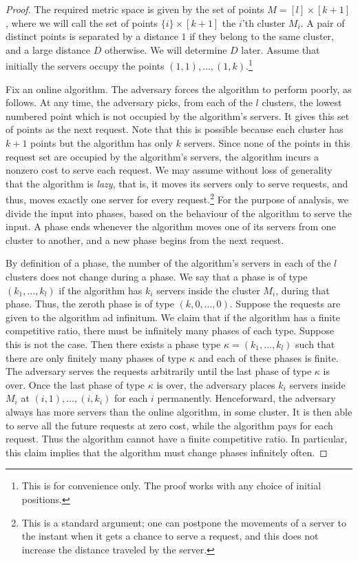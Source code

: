 \documentclass[11pt]{article}
\theoremstyle{plain}\newtheorem{theorem}{Theorem}
\theoremstyle{definition}
\theoremstyle{remark}
\begin{document}
\begin{proof}
The required metric space is given by the set of points $M=[l]\times[k+1]$, where we will call the set of points $\{i\}\times[k+1]$ the $i$'th cluster $M_i$. A pair of distinct points is separated by a distance $1$ if they belong to the same cluster, and a large distance $D$ otherwise. We will determine $D$ later. Assume that initially the servers occupy the points $(1,1),\ldots,(1,k)$.\footnote{This is for convenience only. The proof works with any choice of initial positions.}

Fix an online algorithm. The adversary forces the algorithm to perform poorly, as follows. At any time, the adversary picks, from each of the $l$ clusters, the lowest numbered point which is not occupied by the algorithm's servers. It gives this set of points as the next request. Note that this is possible because each cluster has $k+1$ points but the algorithm has only $k$ servers.
Since none of the points in this request set are occupied by the algorithm's servers, the algorithm incurs a nonzero cost to serve each request. We may assume without loss of generality that the algorithm is \textit{lazy}, that is, it moves its servers only to serve requests, and thus, moves exactly one server for every request.\footnote{This is a standard argument; one can postpone the movements of a server to the instant when it gets a chance to serve a request, and this does not increase the distance traveled by the server.} For the purpose of analysis, we divide the input into phases, based on the behaviour of the algorithm to serve the input. 
A phase ends whenever the algorithm moves one of its servers from one cluster to another, and a new phase begins from the next request.

By definition of a phase, the number of the algorithm's servers in each of the $l$ clusters does not change during a phase. We say that a phase is of type $(k_1,\ldots,k_l)$ if the algorithm has $k_i$ servers inside the cluster $M_i$, during that phase. Thus, the zeroth phase is of type $(k,0,\ldots,0)$. Suppose the requests are given to the algorithm ad infinitum. We claim that if the algorithm has a finite competitive ratio, there must be infinitely many phases of each type. Suppose this is not the case. Then there exists a phase type $\kappa=(k_1,\ldots,k_l)$ such that there are only finitely many phases of type $\kappa$ and each of these phases is finite. The adversary serves the requests arbitrarily until the last phase of type $\kappa$ is over. Once the last phase of type $\kappa$ is over, the adversary places $k_i$ servers inside $M_i$ at $(i,1),\ldots,(i,k_i)$ for each $i$ permanently. Henceforward, the adversary always has more servers than the online algorithm, in some cluster. It is then able to serve all the future requests at zero cost, while the algorithm pays for each request. Thus the algorithm cannot have a finite competitive ratio. In particular, this claim implies that the algorithm must change phases infinitely often.


\end{proof}
\end{document}
